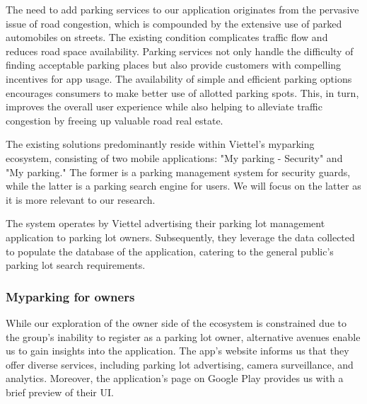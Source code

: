 The need to add parking services to our application originates from the pervasive issue of road congestion, which is compounded by the extensive use of parked automobiles on streets. The existing condition complicates traffic flow and reduces road space availability. Parking services not only handle the difficulty of finding acceptable parking places but also provide customers with compelling incentives for app usage. The availability of simple and efficient parking options encourages consumers to make better use of allotted parking spots. This, in turn, improves the overall user experience while also helping to alleviate traffic congestion by freeing up valuable road real estate.

The existing solutions predominantly reside within Viettel's myparking ecosystem, consisting of two mobile applications: "My parking - Security" and "My parking." The former is a parking management system for security guards, while the latter is a parking search engine for users. We will focus on the latter as it is more relevant to our research.

The system operates by Viettel advertising their parking lot management application to parking lot owners. Subsequently, they leverage the data collected to populate the database of the application, catering to the general public's parking lot search requirements.

\subsubsection{Myparking for owners}

While our exploration of the owner side of the ecosystem is constrained due to the group's inability to register as a parking lot owner, alternative avenues enable us to gain insights into the application. The app's website \cite{myparking_web} informs us that they offer diverse services, including parking lot advertising, camera surveillance, and analytics. Moreover, the application's page on Google Play provides us with a brief preview of their UI.

